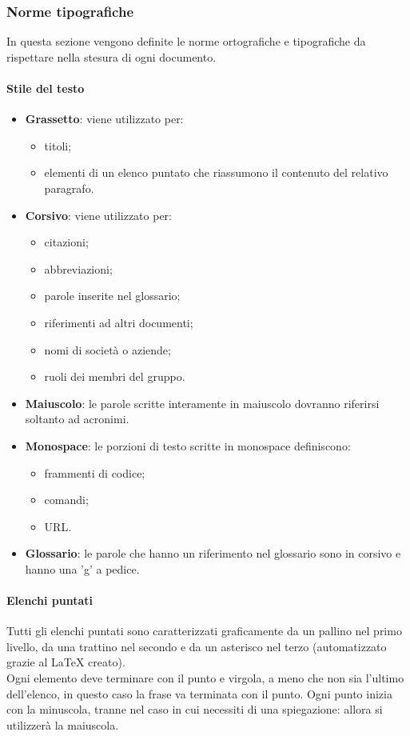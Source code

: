 \subsubsection{Norme tipografiche}
In questa sezione vengono definite le norme ortografiche e tipografiche da rispettare nella stesura di ogni documento.
 \paragraph{Stile del testo} 
\begin{itemize}
	\item \textbf{Grassetto}: viene utilizzato per:
	\begin{itemize}
		\item titoli;
		\item elementi di un elenco puntato che riassumono il contenuto del relativo paragrafo.
	\end{itemize}
	\item \textbf{Corsivo}: viene utilizzato per:
	\begin{itemize}
		\item citazioni;
		\item abbreviazioni;
		\item parole inserite nel glossario;
		\item riferimenti ad altri documenti;
		\item nomi di società o aziende;
		\item ruoli dei membri del gruppo.
	\end{itemize}
	\item \textbf{Maiuscolo}: le parole scritte interamente in maiuscolo dovranno riferirsi soltanto ad acronimi.
	\item \textbf{Monospace}: le porzioni di testo scritte in monospace definiscono:
	\begin{itemize}
		\item frammenti di codice;
		\item comandi;
		\item URL.
	\end{itemize}
	\item \textbf{Glossario}: le parole che hanno un riferimento nel glossario sono in corsivo e hanno una 'g' a pedice.
\end{itemize}
 \paragraph{Elenchi puntati}
Tutti gli elenchi puntati sono caratterizzati graficamente da un pallino nel primo livello, da una trattino nel secondo e da un asterisco nel terzo (automatizzato grazie al  \LaTeX{}{} creato). \\
Ogni elemento deve terminare con il punto e virgola, a meno che non sia l'ultimo dell'elenco, in questo caso la frase va terminata con il punto. Ogni punto inizia con la minuscola, tranne nel caso in cui necessiti di una spiegazione: allora
si utilizzerà la maiuscola.
